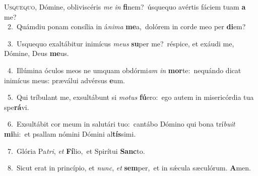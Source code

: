 \lettrine{\initial\textcolor{\initialcolor}{U}}{squequo,} Dómine, obliviscéris \textit{me} \textit{in} \textbf{fi}\-nem?~\star úsquequo avértis fáciem tuam \textbf{a} me?\\
{\numbfont\textcolor{\numbcolor}{~2.}}~Quámdiu ponam consília in á\-\textit{ni}\-\textit{ma} \textbf{me}\-a,~\star dolórem in corde meo per \textbf{di}\-em?\par
{\numbfont\textcolor{\numbcolor}{~3.}}~Usquequo exaltábitur inimícus \textit{me}\-\textit{us} \textbf{su}\-per me?~\star réspice, et exáudi me, Dómine, Deus \textbf{me}\-us.\par
{\numbfont\textcolor{\numbcolor}{~4.}}~Illúmina óculos meos ne umquam obdórmi\textit{am} \textit{in} \textbf{mor}\-te:~\star nequándo dicat inimícus meus: præválui advérsus \textbf{e}\-um.\par
{\numbfont\textcolor{\numbcolor}{~5.}}~Qui tríbulant me, exsultábunt si \textit{mo}\-\textit{tus} \textbf{fú}\-ero:~\star ego autem in misericórdia tua spe\-\textbf{rá}\-vi.\par
{\numbfont\textcolor{\numbcolor}{~6.}}~Exsultábit cor meum in salutári tuo:~\dagger cantábo Dómino qui bona trí\-\textit{bu}\-\textit{it} \textbf{mi}\-hi:~\star et psallam nómini Dómini al\-\textbf{tís}\-simi.\par
{\numbfont\textcolor{\numbcolor}{~7.}}~Glória Pa\-\textit{tri}\-, \textit{et} \textbf{Fí}\-lio,~\star et Spirítui \textbf{Sanc}\-to.\par
{\numbfont\textcolor{\numbcolor}{~8.}}~Sicut erat in princípio, et \textit{nunc}\-, \textit{et} \textbf{sem}\-per,~\star et in sǽcula sæculórum. \textbf{A}\-men.\par
